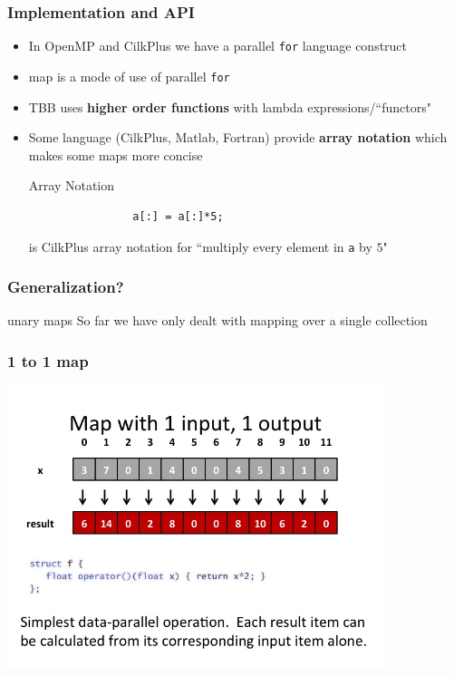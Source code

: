 \documentclass[xcolor=dvipsnames]{beamer}
\begin{document}
	\begin{frame}[fragile] \frametitle{Implementation and API}
		\begin{itemize}
			\item In OpenMP and CilkPlus we have a parallel \texttt{for} 
			language construct
			\item map is a mode of use of parallel \texttt{for}
			\item TBB uses \textbf{higher order functions} with lambda
			expressions/``functors"
			\item Some language (CilkPlus, Matlab, Fortran) provide
			\textbf{array notation} which makes some maps more concise\\
			\begin{exampleblock}{Array Notation}
				\begin{verbatim}
				a[:] = a[:]*5;
				\end{verbatim}
				is CilkPlus array notation for ``multiply every element in 
                \texttt{a} by $5$" 
			\end{exampleblock}
		\end{itemize}
	\end{frame}
		
	\begin{frame} \frametitle{Generalization?}
		\begin{block}{unary maps}
			So far we have only dealt with mapping over a single collection
		\end{block}
	\end{frame}
		
	\begin{frame} \frametitle{1 to 1 map}
		\includegraphics[width=110mm]{images/map1to1.jpg}
	\end{frame}  
		
\end{document}
